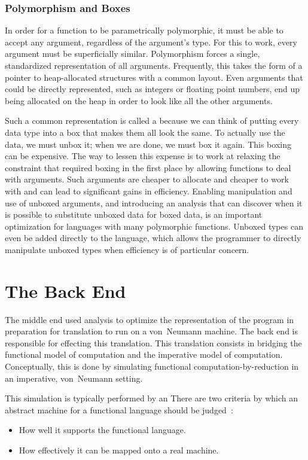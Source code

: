\subsubsection{Polymorphism and Boxes}
In order for a function to be parametrically polymorphic, it must be able to accept any argument, regardless of the argument's type. For this to work, every argument must be superficially similar. Polymorphism forces a single, standardized representation of all arguments. Frequently, this takes the form of a pointer to heap-allocated structures with a common layout. Even arguments that could be directly represented, such as integers or floating point numbers, end up being allocated on the heap in order to look like all the other arguments.

Such a common representation is called a  because we can think of putting every data type into a box that makes them all look the same. To actually use the data, we must unbox it; when we are done, we must box it again. This boxing can be expensive. The way to lessen this expense is to work at relaxing the constraint that required boxing in the first place by allowing functions to deal with  arguments. Such arguments are cheaper to allocate and cheaper to work with and can lead to significant gains in efficiency. Enabling manipulation and use of unboxed arguments, and introducing an analysis that can discover when it is possible to substitute unboxed data for boxed data, is an important optimization for languages with many polymorphic functions. Unboxed types can even be added directly to the language, which allows the programmer to directly manipulate unboxed types when efficiency is of particular concern.

\section{The Back End}
The middle end used analysis to optimize the representation of the program in preparation for translation to run on a von~Neumann machine. The back end is responsible for effecting this translation. This translation consists in bridging the functional model of computation and the imperative model of computation. Conceptually, this is done by simulating functional computation-by-reduction in an imperative, von~Neumann setting.

This simulation is typically performed by an  There are two criteria by which an abstract machine for a functional language should be judged~\citep[p.~184]{Peyton-Jones:The-Spineless:1989}:
\begin{itemize}
\item How well it supports the functional language.
\item How effectively it can be mapped onto a real machine.
\end{itemize}

